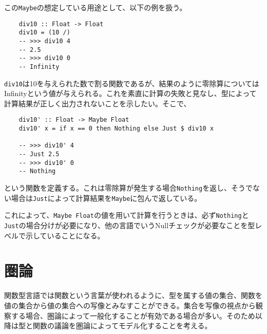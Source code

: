 \documentclass[uplatex,dvipdfmx]{jsarticle}
\newcommand{\pr}[1]{\colorbox[rgb]{0.9,0.9,0.9}{\lstinline{#1}}}
\begin{document}
  この\pr{Maybe}の想定している用途として、以下の例を扱う。
  \begin{lstlisting}
    div10 :: Float -> Float
    div10 = (10 /)
    -- >>> div10 4
    -- 2.5
    -- >>> div10 0
    -- Infinity
  \end{lstlisting}
  \pr{div10}は10を与えられた数で割る関数であるが、結果のように零除算についてはInfinityという値が与えられる。これを素直に計算の失敗と見なし、型によって計算結果が正しく出力されないことを示したい。そこで、
  \begin{lstlisting}
    div10' :: Float -> Maybe Float
    div10' x = if x == 0 then Nothing else Just $ div10 x

    -- >>> div10' 4
    -- Just 2.5
    -- >>> div10' 0
    -- Nothing
  \end{lstlisting}


  という関数を定義する。これは零除算が発生する場合\pr{Nothing}を返し、そうでない場合は\pr{Just}によって計算結果を\pr{Maybe}に包んで返している。

  これによって、\pr{Maybe Float}の値を用いて計算を行うときは、必ず\pr{Nothing}と\pr{Just}の場合分けが必要になり、他の言語でいうNullチェックが必要なことを型レベルで示していることになる。
  \section{圏論}
  関数型言語では関数という言葉が使われるように、型を属する値の集合、関数を値の集合から値の集合への写像とみなすことができる。集合を写像の視点から観察する場合、圏論によって一般化することが有効である場合が多い。そのため以降は型と関数の議論を圏論によってモデル化することを考える。
\end{document}
